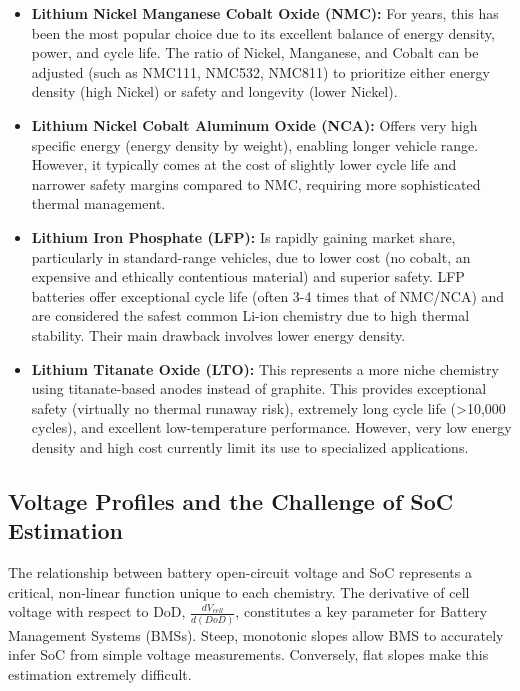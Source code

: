 \begin{itemize}
    \item \textbf{Lithium Nickel Manganese Cobalt Oxide (NMC):} For years, this has been the most popular choice due to its excellent balance of energy density, power, and cycle life. The ratio of Nickel, Manganese, and Cobalt can be adjusted (such as NMC111, NMC532, NMC811) to prioritize either energy density (high Nickel) or safety and longevity (lower Nickel).
    
    \item \textbf{Lithium Nickel Cobalt Aluminum Oxide (NCA):} Offers very high specific energy (energy density by weight), enabling longer vehicle range. However, it typically comes at the cost of slightly lower cycle life and narrower safety margins compared to NMC, requiring more sophisticated thermal management.
    
    \item \textbf{Lithium Iron Phosphate (LFP):} Is rapidly gaining market share, particularly in standard-range vehicles, due to lower cost (no cobalt, an expensive and ethically contentious material) and superior safety. LFP batteries offer exceptional cycle life (often 3-4 times that of NMC/NCA) and are considered the safest common Li-ion chemistry due to high thermal stability. Their main drawback involves lower energy density.
    
    \item \textbf{Lithium Titanate Oxide (LTO):} This represents a more niche chemistry using titanate-based anodes instead of graphite. This provides exceptional safety (virtually no thermal runaway risk), extremely long cycle life (>10,000 cycles), and excellent low-temperature performance. However, very low energy density and high cost currently limit its use to specialized applications.
\end{itemize}

\subsection{Voltage Profiles and the Challenge of SoC Estimation}

The relationship between battery open-circuit voltage and SoC represents a critical, non-linear function unique to each chemistry. The derivative of cell voltage with respect to DoD, $\frac{dV_{cell}}{d(DoD)}$, constitutes a key parameter for Battery Management Systems (BMSs). Steep, monotonic slopes allow BMS to accurately infer SoC from simple voltage measurements. Conversely, flat slopes make this estimation extremely difficult.

